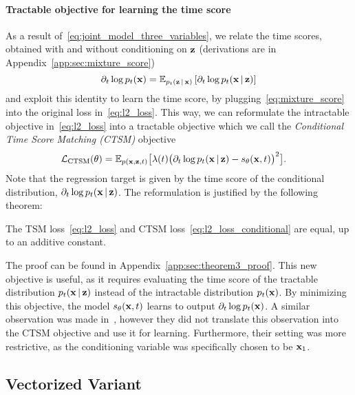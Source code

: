 \paragraph{Tractable objective for learning the time score}
As a result of~\eqref{eq:joint_model_three_variables}, we relate the time scores, obtained with and without conditioning on $\operatorname{\mathbf{z}}$ (derivations are in Appendix~\ref{app:sec:mixture_score})
\begin{equation}
    \label{eq:mixture_score}
    \partial_{t}\log p_{t}(\operatorname{\mathbf{x}}) 
    = 
    \mathbb{E}_{p_t(\operatorname{\mathbf{z}} | \operatorname{\mathbf{x}})} \left[
    \partial_{t}\log p_{t}(\operatorname{\mathbf{x}}|\operatorname{\mathbf{z}}) 
    \right]
\end{equation}
and exploit this identity to learn the time score, 
by plugging~\eqref{eq:mixture_score} into the original loss in~\eqref{eq:l2_loss}. 
This way,  
we can reformulate the intractable objective in~\eqref{eq:l2_loss} into a tractable objective which we call the \textit{Conditional Time Score Matching (CTSM)} objective
    \begin{align}
        \label{eq:l2_loss_conditional}
        \mathcal{L}_{\text{CTSM}}(\operatorname{\mathbf{\theta}}) 
        &= 
        \mathbb{E}_{p(\operatorname{\mathbf{x}}, \operatorname{\mathbf{z}}, t)} \big[
        \lambda(t) \big( \partial_{t}\log p_{t}(\operatorname{\mathbf{x}}|\operatorname{\mathbf{z}}) - s_{\operatorname{\mathbf{\theta}}}(\operatorname{\mathbf{x}}, t) \big)^2 
        \big].
    \end{align}
Note that the regression target is given by the time score of the conditional distribution, $\partial_t \log p_t(\operatorname{\mathbf{x}} | \operatorname{\mathbf{z}})$. The reformulation is justified by the following theorem:
\begin{theorem}
    \label{theorem:ctsm_objective}
    The TSM loss~\eqref{eq:l2_loss} 
    and CTSM loss~\eqref{eq:l2_loss_conditional} are equal, up to an additive constant.
\end{theorem}
The proof can be found in Appendix~\ref{app:sec:theorem3_proof}. This new objective is useful, as it requires evaluating the time score of the tractable distribution $p_t(\operatorname{\mathbf{x}} | \operatorname{\mathbf{z}})$ instead of the intractable distribution $p_t(\operatorname{\mathbf{x}})$. By minimizing this objective, the model $s_{\operatorname{\mathbf{\theta}}}(\operatorname{\mathbf{x}},t)$ learns to output $\partial_{t} \log p_{t}(\operatorname{\mathbf{x}})$. A similar observation was made in~\citet[Appendix L.3.]{deBortoli2022}, however they did not translate this observation into the CTSM objective and use it for learning. Furthermore, their setting was more restrictive, as the conditioning variable was specifically chosen to be $\operatorname{\mathbf{x}}_1$.

\subsection{Vectorized Variant}

